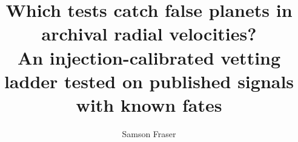 \documentclass[twocolumn,numberedappendix,appendixfloats]{openjournal}
\begin{document}
\title{Which tests catch false planets in archival radial velocities?\\
       An injection-calibrated vetting ladder tested on published signals with known fates}

\author{Samson Fraser}
\end{document}
